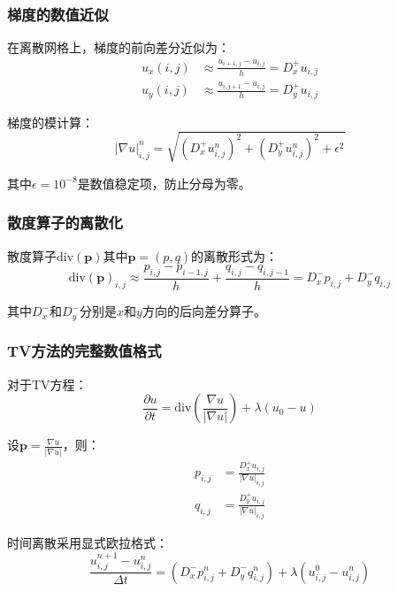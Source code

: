 \documentclass[a4paper,12pt]{ctexart}
\begin{document}
\subsubsection{梯度的数值近似}

在离散网格上，梯度的前向差分近似为：
\begin{align}
u_x(i,j) &\approx \frac{u_{i+1,j} - u_{i,j}}{h} = D_x^+ u_{i,j} \\
u_y(i,j) &\approx \frac{u_{i,j+1} - u_{i,j}}{h} = D_y^+ u_{i,j}
\end{align}

梯度的模计算：
\begin{equation}
|\nabla u|_{i,j}^n = \sqrt{(D_x^+ u_{i,j}^n)^2 + (D_y^+ u_{i,j}^n)^2 + \epsilon^2}
\end{equation}

其中$\epsilon = 10^{-8}$是数值稳定项，防止分母为零。

\subsubsection{散度算子的离散化}

散度算子$\text{div}(\mathbf{p})$其中$\mathbf{p} = (p,q)$的离散形式为：
\begin{equation}
\text{div}(\mathbf{p})_{i,j} \approx \frac{p_{i,j} - p_{i-1,j}}{h} + \frac{q_{i,j} - q_{i,j-1}}{h} = D_x^- p_{i,j} + D_y^- q_{i,j}
\end{equation}

其中$D_x^-$和$D_y^-$分别是$x$和$y$方向的后向差分算子。

\subsubsection{TV方法的完整数值格式}

对于TV方程：
\begin{equation}
\frac{\partial u}{\partial t} = \text{div}\left(\frac{\nabla u}{|\nabla u|}\right) + \lambda(u_0 - u)
\end{equation}

设$\mathbf{p} = \frac{\nabla u}{|\nabla u|}$，则：
\begin{align}
p_{i,j} &= \frac{D_x^+ u_{i,j}}{|\nabla u|_{i,j}} \\
q_{i,j} &= \frac{D_y^+ u_{i,j}}{|\nabla u|_{i,j}}
\end{align}

时间离散采用显式欧拉格式：
\begin{equation}
\frac{u_{i,j}^{n+1} - u_{i,j}^n}{\Delta t} = (D_x^- p_{i,j}^n + D_y^- q_{i,j}^n) + \lambda(u_{i,j}^0 - u_{i,j}^n)
\end{equation}
\end{document}
